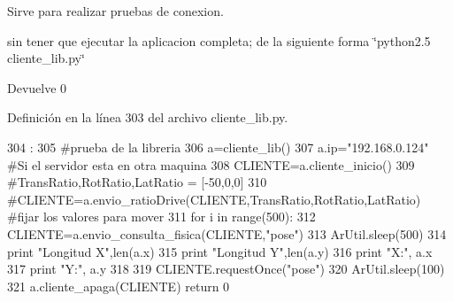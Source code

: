 Sirve para realizar pruebas de conexion. 

sin tener que ejecutar la aplicacion completa; de la siguiente forma \char`\"{}python2.5 cliente\_\-lib.py\char`\"{} \begin{DoxyReturn}{Devuelve}
0 
\end{DoxyReturn}


Definición en la línea 303 del archivo cliente\_\-lib.py.


\begin{DoxyCode}
304           :
305         #prueba de la libreria
306         a=cliente_lib()
307         a.ip="192.168.0.124" #Si el servidor esta en otra maquina 
308         CLIENTE=a.cliente_inicio()
309         #TransRatio,RotRatio,LatRatio = [-50,0,0]
310         #CLIENTE=a.envio_ratioDrive(CLIENTE,TransRatio,RotRatio,LatRatio) #fijar 
      los valores para mover
311         for i in range(500):
312                 CLIENTE=a.envio_consulta_fisica(CLIENTE,"pose")
313                 ArUtil.sleep(500)
314                 print "Longitud X",len(a.x)
315                 print "Longitud Y",len(a.y)
316         print "X:", a.x
317         print "Y:", a.y
318                 
319         CLIENTE.requestOnce("pose")
320         ArUtil.sleep(100)
321         a.cliente_apaga(CLIENTE)
        return 0
\end{DoxyCode}
